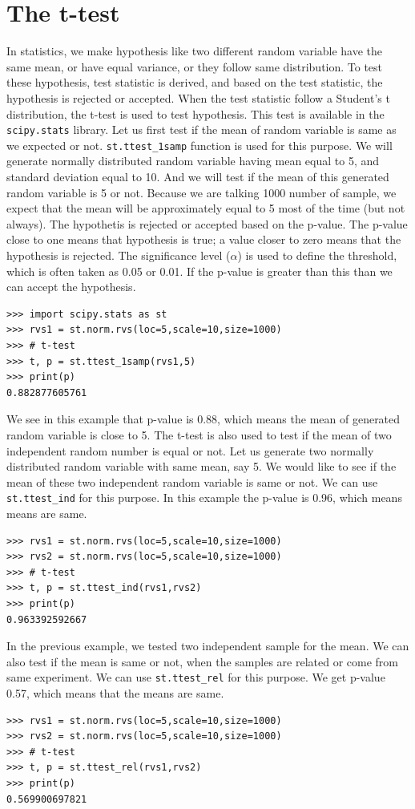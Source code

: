 \documentclass[10pt]{book}
\begin{document}
{\section{The t-test}
In statistics, we make hypothesis like two different random variable have the same mean, or have equal variance, or they follow same distribution. To test these hypothesis, test statistic is derived, and based on the test statistic, the hypothesis is rejected or accepted. When the test statistic follow a Student's t distribution, the t-test is used to test hypothesis. This test is available in the \verb"scipy.stats" library. Let us first test if the mean of random variable is same as we expected or not. \verb"st.ttest_1samp" function is used for this purpose. We will generate normally distributed random variable having mean equal to 5, and standard deviation equal to 10. And we will test if the mean of this generated random variable is 5 or not. Because we are talking 1000 number of sample, we expect that the mean will be approximately equal to 5 most of the time (but not always). The hypothetis is rejected or accepted based on the p-value. The p-value close to one means that hypothesis is true; a value closer to zero means that the hypothesis is rejected. The significance level ($\alpha$) is used to define the threshold, which is often taken as 0.05 or 0.01. If the p-value is greater than this than we can accept the hypothesis. 
\beforeverb \begin{verbatim}
>>> import scipy.stats as st
>>> rvs1 = st.norm.rvs(loc=5,scale=10,size=1000)
>>> # t-test
>>> t, p = st.ttest_1samp(rvs1,5)
>>> print(p)
0.882877605761
\end{verbatim} \afterverb
We see in this example that p-value is 0.88, which means the mean of generated random variable is close to 5. The t-test is also used to test if the mean of two independent random number is equal or not. Let us generate two normally distributed random variable with same mean, say 5. We would like to see if the mean of these two independent random variable is same or not. We can use \verb"st.ttest_ind" for this purpose. In this example the p-value is 0.96, which means means are same.
\beforeverb \begin{verbatim}
>>> rvs1 = st.norm.rvs(loc=5,scale=10,size=1000)
>>> rvs2 = st.norm.rvs(loc=5,scale=10,size=1000)
>>> # t-test
>>> t, p = st.ttest_ind(rvs1,rvs2)
>>> print(p)
0.963392592667
\end{verbatim} \afterverb

In the previous example, we tested two independent sample for the mean. We can also test if the mean is same or not, when the samples are related or come from same experiment. We can use \verb"st.ttest_rel" for this purpose. We get p-value 0.57, which means that the means are same.
\beforeverb \begin{verbatim}
>>> rvs1 = st.norm.rvs(loc=5,scale=10,size=1000)
>>> rvs2 = st.norm.rvs(loc=5,scale=10,size=1000)
>>> # t-test
>>> t, p = st.ttest_rel(rvs1,rvs2)
>>> print(p)
0.569900697821
\end{verbatim} \afterverb

}
\end{document}
